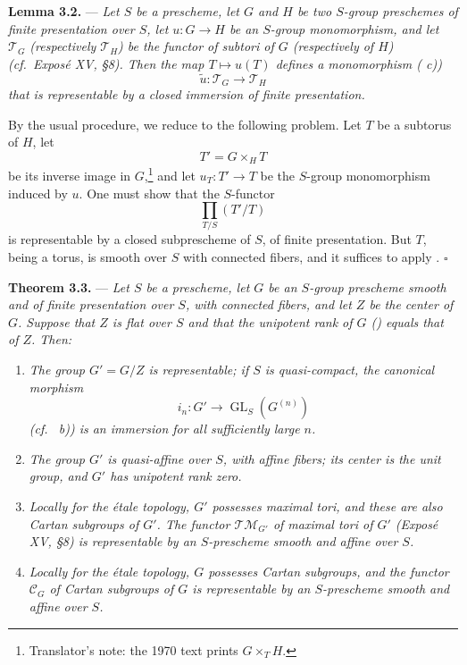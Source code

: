 \medskip
\noindent{}%
\textbf{Lemma 3.2.} --- \textit{Let \(S\) be a prescheme, let \(G\)
and \(H\) be two \(S\)-group preschemes of finite presentation over
\(S\), let \(u:G\to H\) be an \(S\)-group monomorphism, and let
\(\mathscr T_G\) (respectively \(\mathscr T_H\)) be the functor of
subtori of \(G\) (respectively of \(H\)) (cf.\ Exposé XV, \S8).
Then the map \(T\mapsto u(T)\) defines a monomorphism
( c))}
\[
  \widetilde u:\mathscr T_G\longrightarrow\mathscr T_H
\]
\textit{that is representable by a closed immersion of finite
presentation.}

By the usual procedure, we reduce to the following problem. Let
\(T\) be a subtorus of \(H\), let
\[
  T'=G\times_H T
\]
be its inverse image in \(G\),\footnote{Translator's note: the 1970 text prints \(G\times_T H\).} and let \(u_T:T'\to T\) be the
\(S\)-group monomorphism induced by \(u\). One must show that the
\(S\)-functor
\[
  \prod_{T/S}(T'/T)
\]
is representable by a closed subprescheme of \(S\), of finite
presentation. But \(T\), being a torus, is smooth over \(S\) with
connected fibers, and it suffices to apply .
\hfill\(\square\)

\medskip
\noindent{}%
\textbf{Theorem 3.3.} --- \textit{Let \(S\) be a prescheme, let
\(G\) be an \(S\)-group prescheme smooth and of finite presentation
over \(S\), with connected fibers, and let \(Z\) be the center of
\(G\). Suppose that \(Z\) is flat over \(S\) and that the unipotent
rank of \(G\) () equals that of \(Z\). Then:}

\begin{enumerate}
\renewcommand{\labelenumi}{\textit{\alph{enumi})}}
\item \textit{The group \(G'=G/Z\) is representable; if \(S\) is
quasi-compact, the canonical morphism}
\[
  i_n:G'\longrightarrow\operatorname{GL}_S(G^{(n)})
\]
\textit{(cf.\  b)) is an immersion for all sufficiently large
\(n\).}

\item \textit{The group \(G'\) is quasi-affine over \(S\), with
affine fibers; its center is the unit group, and \(G'\) has
unipotent rank zero.}

\item \textit{Locally for the étale topology, \(G'\) possesses
maximal tori, and these are also Cartan subgroups of \(G'\). The
functor \(\mathscr{TM}_{G'}\) of maximal tori of \(G'\)
(Exposé XV, \S8) is representable by an \(S\)-prescheme smooth and
affine over \(S\).}

\item \textit{Locally for the étale topology, \(G\) possesses
Cartan subgroups, and the functor \(\mathscr C_G\) of Cartan
subgroups of \(G\) is representable by an \(S\)-prescheme smooth
and affine over \(S\).}
\end{enumerate}

